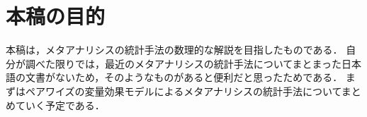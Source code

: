 
\section{本稿の目的}
\label{sec:1}
本稿は，メタアナリシスの統計手法の数理的な解説を目指したものである．
自分が調べた限りでは，最近のメタアナリシスの統計手法についてまとまった日本語の文書がないため，そのようなものがあると便利だと思ったためである．
まずはペアワイズの変量効果モデルによるメタアナリシスの統計手法についてまとめていく予定である．
